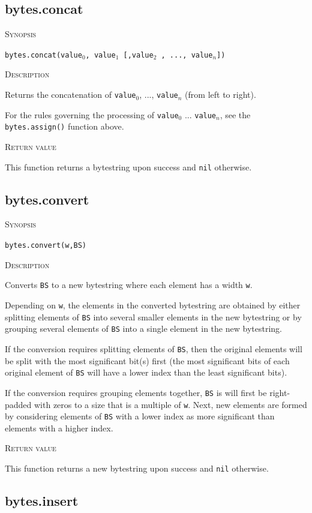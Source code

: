 \documentclass[11pt]{report}
\newcommand{\mansection}[1]{\vspace{0.5em}\par\noindent\textsc{#1}\vspace{0.5em}\par}
\newcommand{\syn}[1]{\texttt{#1}}
\begin{document}
\subsection{bytes.concat}

\mansection{Synopsis}
\syn{bytes.concat(\syn{value$_0$}, \syn{value$_1$} [,\syn{value$_2$} , ..., \syn{value$_n$}])}

\mansection{Description}
  Returns the concatenation of \syn{value$_0$}, ..., \syn{value$_n$} (from left to right).

  For the rules governing the processing of \syn{value$_0$} ... \syn{value$_n$}, see
  the \syn{bytes.assign()} function above.

\mansection{Return value}
  This function returns a bytestring upon success and \syn{nil} otherwise.

\subsection{bytes.convert}

\mansection{Synopsis}
\syn{bytes.convert(w,BS)}

\mansection{Description}
  Converts \syn{BS} to a new bytestring where each element has a width \syn{w}.

  Depending on \syn{w}, the elements in the converted bytestring are obtained by either 
  splitting elements of \syn{BS} into several smaller elements in the new bytestring or 
  by grouping several elements of \syn{BS} into a single element in the new bytestring.

  If the conversion requires splitting elements of \syn{BS}, then the original elements will
  be split with the most significant bit(s) first (the most significant bits of each 
  original element of \syn{BS} will have a lower index than the least significant bits). 

  If the conversion requires grouping elements together, \syn{BS} is will first be 
  right-padded with zeros to a size that is a multiple of \syn{w}. Next, new 
  elements are formed by considering elements of \syn{BS} with a lower index as more 
  significant than elements with a higher index.

\mansection{Return value}
  This function returns a new bytestring upon success and \syn{nil} otherwise.

\subsection{bytes.insert}
\end{document}
